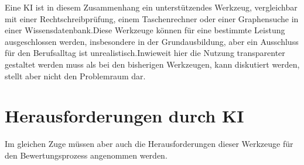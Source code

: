 \documentclass[conference]{IEEEtran}
\begin{document}
Eine KI ist in diesem Zusammenhang ein unterstützendes Werkzeug, vergleichbar mit einer Rechtschreibprüfung, einem Taschenrechner oder einer Graphensuche in einer Wissensdatenbank.Diese Werkzeuge können für eine bestimmte Leistung ausgeschlossen werden, insbesondere in der Grundausbildung, aber ein Ausschluss für den Berufsalltag ist unrealistisch.Inwieweit hier die Nutzung transparenter gestaltet werden muss als bei den bisherigen Werkzeugen, kann diskutiert werden, stellt aber nicht den Problemraum dar.

\section{Herausforderungen durch KI}

Im gleichen Zuge müssen aber auch die Herausforderungen dieser Werkzeuge für den Bewertungsprozess angenommen werden.
\end{document}
